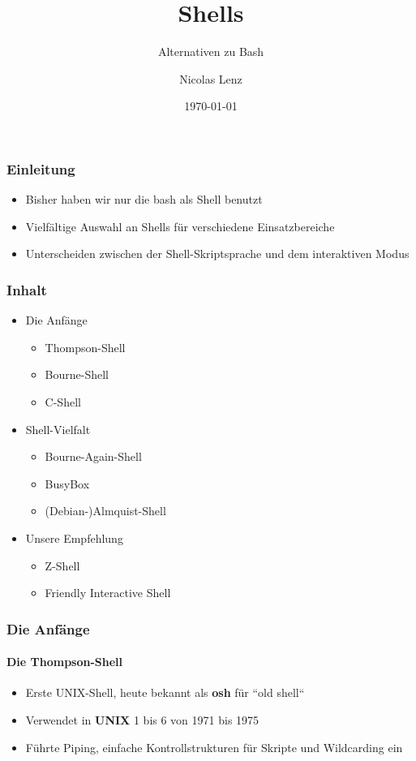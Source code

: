 \documentclass[12pt,utf8]{beamer}
\title{Shells}
\subtitle{Alternativen zu Bash}
\author[N. Lenz]{Nicolas Lenz}
\institute[FOSS AG]{Free and Open Source Software AG\\Fakultät für Informatik}
\date{\today}
\begin{document}
	\titlepage
	
	\begin{frame}
	\frametitle{Einleitung}
	\begin{itemize}
		\item Bisher haben wir nur die bash als Shell benutzt
		\item Vielfältige Auswahl an Shells für verschiedene Einsatzbereiche
		\item Unterscheiden zwischen der Shell-Skriptsprache und dem interaktiven Modus
	\end{itemize}
	\end{frame}

	\begin{frame}
	\frametitle{Inhalt}
	\begin{itemize}
		\item Die Anfänge
		\begin{itemize}
			\item Thompson-Shell
			\item Bourne-Shell
			\item C-Shell
		\end{itemize}
		\pause
		\item Shell-Vielfalt
		\begin{itemize}
			\item Bourne-Again-Shell
			\item BusyBox
			\item (Debian-)Almquist-Shell
		\end{itemize}
		\pause
		\item Unsere Empfehlung
		\begin{itemize}
			\item Z-Shell
			\item Friendly Interactive Shell
		\end{itemize}
	\end{itemize}
	\end{frame}

	\begin{frame}
	\frametitle{Die Anfänge}
	\framesubtitle{Die Thompson-Shell}
	\begin{itemize}
		\item Erste UNIX-Shell, heute bekannt als \textbf{osh} für ``old shell``
		\item Verwendet in \textbf{UNIX} 1 bis 6 von 1971 bis 1975
		\item Führte Piping, einfache Kontrollstrukturen für Skripte und Wildcarding ein
	\end{itemize}
	\end{frame}
\end{document}

